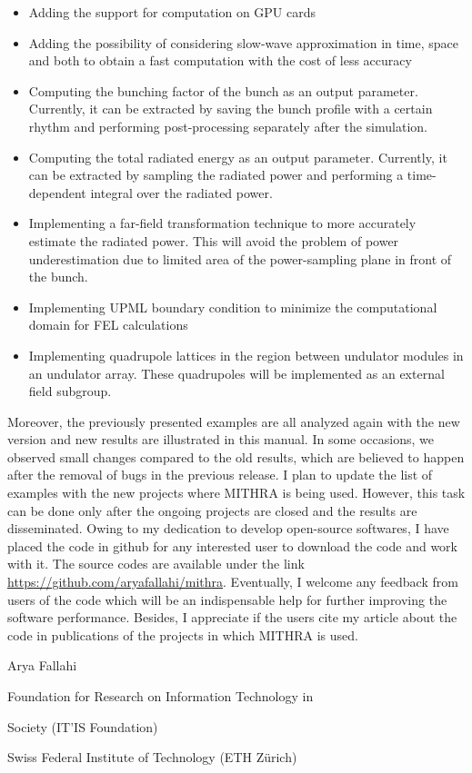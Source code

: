 \begin{itemize}
	\setlength{\parskip}{0pt}
	\setlength{\itemsep}{0pt plus 1pt}
	\item Adding the support for computation on GPU cards
	\item Adding the possibility of considering slow-wave approximation in time, space and both to obtain a fast computation with the cost of less accuracy
	\item Computing the bunching factor of the bunch as an output parameter. Currently, it can be extracted by saving the bunch profile with a certain rhythm and performing post-processing separately after the simulation.
	\item Computing the total radiated energy as an output parameter. Currently, it can be extracted by sampling the radiated power and performing a time-dependent integral over the radiated power.
	\item Implementing a far-field transformation technique to more accurately estimate the radiated power. This will avoid the problem of power underestimation due to limited area of the power-sampling plane
	 in front of the bunch.
	\item Implementing UPML boundary condition to minimize the computational domain for FEL calculations
	\item Implementing quadrupole lattices in the region between undulator modules in an undulator array. These quadrupoles will be implemented as an external field subgroup. 
\end{itemize}
%
Moreover, the previously presented examples are all analyzed again with the new version and new results are illustrated in this manual.
%
In some occasions, we observed small changes compared to the old results, which are believed to happen after the removal of bugs in the previous release.
%
I plan to update the list of examples with the new projects where MITHRA is being used.
%
However, this task can be done only after the ongoing projects are closed and the results are disseminated.
%
Owing to my dedication to develop open-source softwares, I have placed the code in github for any interested user to download the code and work with it.
%
The source codes are available under the link \href{https://github.com/aryafallahi/mithra}{https://github.com/aryafallahi/mithra}.
%
Eventually, I welcome any feedback from users of the code which will be an indispensable help for further improving the software performance.
%
Besides, I appreciate if the users cite my article about the code \cite{fallahi2018mithra} in publications of the projects in which MITHRA is used.

\vspace{1cm}

\hspace{10cm} Arya Fallahi

\hspace{10cm} Foundation for Research on Information Technology in 

\hspace{10cm} Society (IT'IS Foundation)

\hspace{10cm} Swiss Federal Institute of Technology (ETH Z\"urich)